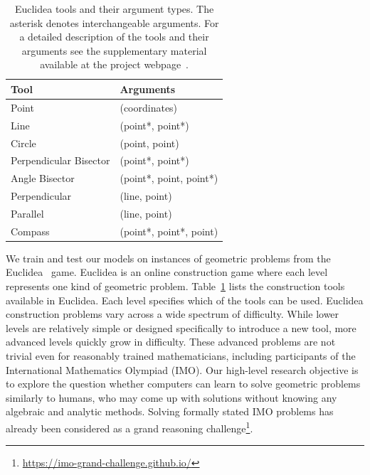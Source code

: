 \begin{table}[!htb]
    \centering
    \setlength{\tabcolsep}{6pt}
    \begin{tabular}{l|l}
         Tool & Arguments \\
         \hline
         Point & (coordinates)\\
         Line & (point*, point*)\\
         Circle & (point, point)\\
         Perpendicular Bisector & (point*, point*)\\
         Angle Bisector & (point*, point, point*)\\
         Perpendicular & (line, point)\\
         Parallel & (line, point)\\
         Compass & (point*, point*, point)\\
    \end{tabular}
    \caption{Euclidea tools and their argument types.
    The asterisk denotes interchangeable arguments. For a detailed description of the tools and their arguments see the supplementary material available at the project webpage~\cite{project-page}.}
    \label{tab:tool_overview}
    \vspace*{-2em}
\end{table}

We train and test our models on instances of geometric problems from the Euclidea~\cite{euclidea} game.
Euclidea is an online construction game where each level represents one kind of geometric problem.
Table~\ref{tab:tool_overview} lists the construction tools available in Euclidea. Each level specifies which of the tools can be used.
Euclidea construction problems vary across a wide spectrum of difficulty.
While lower levels are relatively simple or designed specifically to introduce a new tool, more advanced levels quickly grow in difficulty.
These advanced problems are not trivial even for reasonably trained mathematicians, including participants of the International Mathematics Olympiad (IMO).
Our high-level research objective is to explore the question whether computers can learn to solve geometric problems similarly to humans, who may come up with solutions without knowing any algebraic and analytic methods. Solving formally stated IMO problems has already been considered as a grand reasoning challenge\footnote{\smaller \url{https://imo-grand-challenge.github.io/}}.

